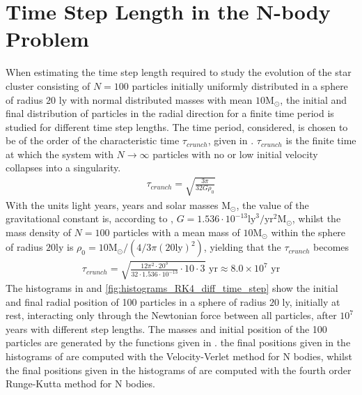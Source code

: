 \section{Time Step Length in the N-body Problem}
\label{sec:TimeStepLengthNbody}
When estimating the time step length required to study the evolution of the star cluster consisting of $N=100$ particles initially uniformly distributed in a sphere of radius $20$ ly with normal distributed masses with mean $10{\textrm{M}}_{\odot}$, the initial and final distribution of particles in the radial direction for a finite time period is studied for different time step lengths. 
The time period, considered, is chosen to be of the order of the characteristic time $\tau _{crunch}$, given in .
$\tau _{crunch}$ is the finite time at which the system with $N \rightarrow \infty$ particles with no or low initial velocity collapses into a singularity. 
\begin{align}
	\tau _{crunch} = \sqrt{\frac{3\pi}{32G\rho_0}}
	\label{eq:t_crunch}
\end{align}
With the units light years, years and solar masses ${\textrm{M}}_{\odot}$, the value of the gravitational constant is, according to , $G = 1.536\cdot 10^{-13} \textrm{ly}^3 / \textrm{yr}^2 {\textrm{M}}_{\odot}$, whilst the mass density of $N=100$ particles with a mean mass of $10 {\textrm{M}}_{\odot}$ within the sphere of radius $20 \text{ly}$ is 
$\rho_0 = 10 {\textrm{M}}_{\odot} / (4/3 \pi (20 \text{ly})^2)$, yielding that the $\tau _{crunch}$ becomes
\begin{align}
	\tau _{crunch} = \sqrt{\frac{12\pi^2\cdot 20^3}{32\cdot 1.536\cdot 10^{-13}}\cdot 10\cdot 3} \text{ yr} 
	\approx 8.0\times 10^7 \text{ yr}
\end{align}
The histograms in  and \ref{fig:histograms_RK4_diff_time_step} show the initial and final radial position of 100 particles in a sphere of radius $20$ ly, initially at rest, interacting only through the Newtonian force between all particles, after $10^7$ years with different step lengths. 
The masses and initial position of the 100 particles are generated by the functions given in .
the final positions given in the histograms of  are computed with the Velocity-Verlet method for N bodies, whilst the final positions given in the histograms of  are computed with the fourth order Runge-Kutta method for N bodies.
